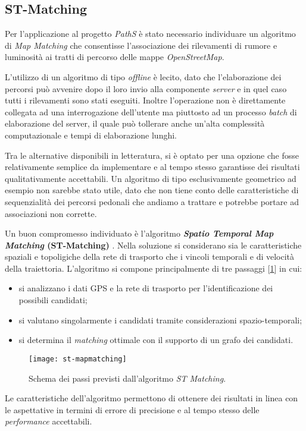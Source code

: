 \subsection{ST-Matching}
Per l'applicazione al progetto \emph{PathS} è stato necessario individuare un algoritmo di \emph{Map Matching} che consentisse l'associazione dei rilevamenti di rumore e luminosità ai tratti di percorso delle mappe \emph{OpenStreetMap}. 

L'utilizzo di un algoritmo di tipo \emph{offline} è lecito, dato che l'elaborazione dei percorsi può avvenire dopo il loro invio alla componente \emph{server} e in quel caso tutti i rilevamenti sono stati eseguiti. Inoltre l'operazione non è direttamente collegata ad una interrogazione dell'utente ma piuttosto ad un processo \emph{batch} di elaborazione del server, il quale può tollerare anche un'alta complessità computazionale e tempi di elaborazione lunghi.

Tra le alternative disponibili in letteratura, si è optato per una opzione che fosse relativamente semplice da implementare e al tempo stesso garantisse dei risultati qualitativamente accettabili. Un algoritmo di tipo esclusivamente geometrico ad esempio non sarebbe stato utile, dato che non tiene conto delle caratteristiche di sequenzialità dei percorsi pedonali che andiamo a trattare e potrebbe portare ad associazioni non corrette.

Un buon compromesso individuato è l'algoritmo \textbf{\emph{Spatio Temporal Map Matching} (ST-Matching)} \cite{stmapmatching}. Nella soluzione si considerano sia le caratteristiche spaziali e topoligiche della rete di trasporto che i vincoli temporali e di velocità della traiettoria. L'algoritmo si compone principalmente di tre passaggi [\ref{fig:st-mapmatching}] in cui:
\begin{itemize}
	\item si analizzano i dati GPS e la rete di trasporto per l'identificazione dei possibili candidati;
	\item si valutano singolarmente i candidati tramite considerazioni spazio-temporali;
	\item si determina il \emph{matching} ottimale con il supporto di un grafo dei candidati.
\end{itemize}
\begin{figure}[h]
  \centering
  \texttt{[image: st-mapmatching]}
  \caption{\footnotesize{Schema dei passi previsti dall'algoritmo \emph{ST Matching}.}}
  \label{fig:st-mapmatching}
\end{figure}
Le caratteristiche dell'algoritmo permettono di ottenere dei risultati in linea con le aspettative in termini di errore di precisione e al tempo stesso delle \emph{performance} accettabili. 

